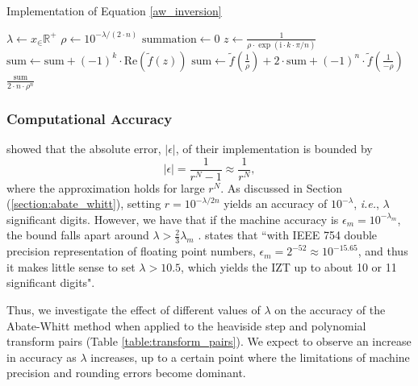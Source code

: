 \documentclass[a4paper]{report}
\begin{document}
\begin{algorithm}[H]
    \caption{Implementation of Equation \ref{aw_inversion}}
    \begin{algorithmic}[1]
        \State $\lambda \gets x_\in \mathbb{R}^+$
        \State $\rho \gets 10^{-\lambda / (2 \cdot n)}$
        \State $\text{summation} \gets 0$
            \State $z \gets \frac{1}{\rho \cdot \exp(\text{i} \cdot k \cdot \pi / n)}$
            \State $\text{sum} \gets \text{sum} + (-1)^k \cdot \text{Re}(\tilde{f}(z))$
        \EndFor
        \State $\text{sum} \gets \tilde{f}(\frac{1}{\rho}) + 2 \cdot \text{sum} + (-1)^n \cdot \tilde{f}(\frac{1}{-\rho})$
        \State \Return $\frac{\text{sum}}{2 \cdot n \cdot \rho^n}$
    \EndProcedure
    \end{algorithmic}
\end{algorithm}

\subsubsection{Computational Accuracy}
\citet{AbateWhitt1992a, AbateWhitt1992b} showed that the absolute error, $|\epsilon |$, of their implementation is bounded by
\begin{equation}
	| \epsilon | = \frac{1}{r^N - 1} \approx \frac{1}{r^N},
\end{equation}
where the approximation holds for large $r^N$. As discussed in Section (\ref{section:abate_whitt}), setting $r=10^{-\lambda / 2n}$  yields an accuracy of $10^{-\lambda}$, \textit{i.e.}, $\lambda$ significant digits. However, we have that if the machine accuracy is $\epsilon_m = 10^{-\lambda_m}$, the bound falls apart around $\lambda > \frac{2}{3} \lambda_m$ \citep[Remark 5.8]{AbateWhitt1992a}. \citet{loveless2023phelanguido} states that ``with IEEE 754 double precision representation of floating point numbers, $\epsilon_m = 2^{-52} \approx 10^{-15.65}$, and thus it makes little sense to set $\lambda > 10.5$, which yields the IZT up to about 10 or 11 significant digits".

Thus, we investigate the effect of different values of $\lambda$ on the accuracy of the Abate-Whitt method when applied to the heaviside step and polynomial transform pairs (Table \ref{table:transform_pairs}). We expect to observe an increase in accuracy as $\lambda$ increases, up to a certain point where the limitations of machine precision and rounding errors become dominant.
\end{document}
